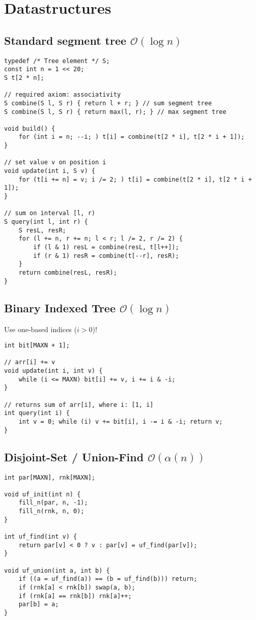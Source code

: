 \documentclass{article}
\begin{document}
\section{Datastructures}
\subsection{Standard segment tree $\mathcal{O}(\log n)$}

\begin{lstlisting}
typedef /* Tree element */ S;
const int n = 1 << 20;
S t[2 * n];

// required axiom: associativity
S combine(S l, S r) { return l + r; } // sum segment tree
S combine(S l, S r) { return max(l, r); } // max segment tree

void build() {
	for (int i = n; --i; ) t[i] = combine(t[2 * i], t[2 * i + 1]);
}

// set value v on position i
void update(int i, S v) {
	for (t[i += n] = v; i /= 2; ) t[i] = combine(t[2 * i], t[2 * i + 1]);
}

// sum on interval [l, r)
S query(int l, int r) {
	S resL, resR;
	for (l += n, r += n; l < r; l /= 2, r /= 2) {
		if (l & 1) resL = combine(resL, t[l++]);
		if (r & 1) resR = combine(t[--r], resR);
	}
	return combine(resL, resR);
}
\end{lstlisting}

\subsection{Binary Indexed Tree $\mathcal{O}(\log n)$}

Use one-based indices ($i > 0$)!

\begin{lstlisting}
int bit[MAXN + 1];

// arr[i] += v
void update(int i, int v) {
	while (i <= MAXN) bit[i] += v, i += i & -i;
}

// returns sum of arr[i], where i: [1, i]
int query(int i) {
	int v = 0; while (i) v += bit[i], i -= i & -i; return v;
}
\end{lstlisting}

\subsection{Disjoint-Set / Union-Find $\mathcal{O}(\alpha (n))$}

\begin{lstlisting}
int par[MAXN], rnk[MAXN];

void uf_init(int n) {
	fill_n(par, n, -1);
	fill_n(rnk, n, 0);
}

int uf_find(int v) {
	return par[v] < 0 ? v : par[v] = uf_find(par[v]);
}

void uf_union(int a, int b) {
	if ((a = uf_find(a)) == (b = uf_find(b))) return;
	if (rnk[a] < rnk[b]) swap(a, b);
	if (rnk[a] == rnk[b]) rnk[a]++;
	par[b] = a;
}
\end{lstlisting}
\end{document}
